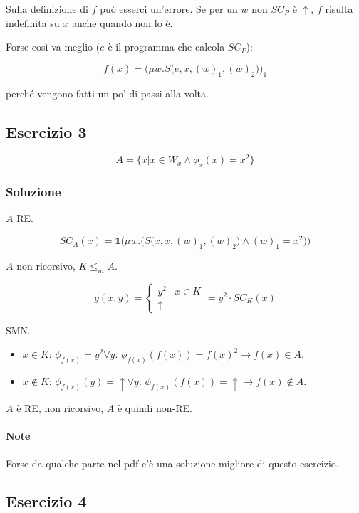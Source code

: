 Sulla definizione di $f$ può esserci un'errore. Se per un $w$ non $SC_P$ è $\uparrow$, $f$ risulta indefinita su $x$ anche quando non lo è. 

Forse così va meglio ($e$ è il programma che calcola $SC_P$):

$$
f(x) = \bigg(\mu w . S\Big(e, x, (w)_1, (w)_2\Big)\bigg)_1
$$

perché vengono fatti un po' di passi alla volta.

\subsection{Esercizio 3}

$$
A = \{ x | x \in W_x \wedge \phi_x(x) = x^2 \}
$$

\subsubsection{Soluzione}

$A$ RE.

$$
SC_A(x) = \mathbb{1} \Bigg( \mu w. \bigg( S\Big(x,x,(w)_1, (w)_2\Big) \wedge (w)_1 = x^2 \bigg) \Bigg)
$$

$A$ non ricorsivo, $K \leq_m A$.

$$
g(x,y) = \begin{cases}
y^2 & x \in K \\
\uparrow
\end{cases} = y^2 \cdot SC_K(x)
$$

SMN.

\begin{itemize}
	\item $x \in K$: $\phi_{f(x)} = y^2 \forall y$. $\phi_{f(x)}(f(x)) = f(x)^2 \rightarrow f(x) \in A$.
	\item $x \notin K$: $\phi_{f(x)}(y) = \uparrow \forall y$.  $\phi_{f(x)}(f(x)) = \uparrow \rightarrow f(x) \notin A$.
\end{itemize}

$A$ è RE, non ricorsivo, $\overline{A}$ è quindi non-RE.

\paragraph{Note}
Forse da qualche parte nel pdf c'è una soluzione migliore di questo esercizio.

\subsection{Esercizio 4}

